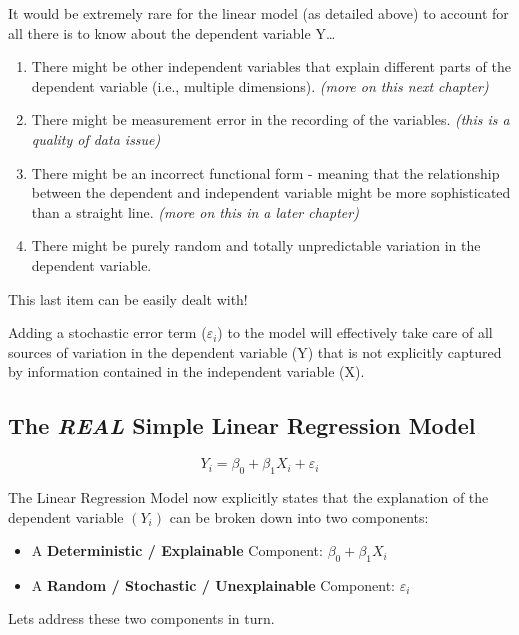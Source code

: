 \documentclass[
]{book}
\begin{document}
It would be extremely rare for the linear model (as detailed above) to account for all there is to know about the dependent variable Y\ldots{}

\begin{enumerate}
\def\labelenumi{\arabic{enumi}.}
\item
  There might be other independent variables that explain different parts of the dependent variable (i.e., multiple dimensions). \emph{(more on this next chapter)}
\item
  There might be measurement error in the recording of the variables. \emph{(this is a quality of data issue)}
\item
  There might be an incorrect functional form - meaning that the relationship between the dependent and independent variable might be more sophisticated than a straight line. \emph{(more on this in a later chapter)}
\item
  There might be purely random and totally unpredictable variation in the dependent variable.
\end{enumerate}

This last item can be easily dealt with!

Adding a stochastic error term (\(\varepsilon_i\)) to the model will effectively take care of all sources of variation in the dependent variable (Y) that is not explicitly captured by information contained in the independent variable (X).

\subsection{\texorpdfstring{The \emph{REAL} Simple Linear Regression Model}{The REAL Simple Linear Regression Model}}\label{the-real-simple-linear-regression-model}

\[Y_i=\beta_0+\beta_1X_i+\varepsilon_i\]

The Linear Regression Model now explicitly states that the explanation of the dependent variable \((Y_i)\) can be broken down into two components:

\begin{itemize}
\item
  A \textbf{Deterministic / Explainable} Component: \(\beta_0+\beta_1X_i\)
\item
  A \textbf{Random / Stochastic / Unexplainable} Component: \(\varepsilon_i\)
\end{itemize}

Lets address these two components in turn.
\end{document}
